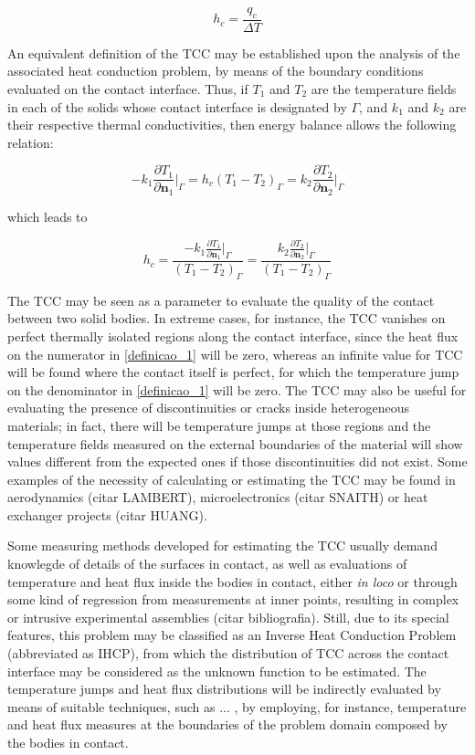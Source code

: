 \documentclass[conference,compsoc]{IEEEtran}
\begin{document}
\begin{equation}
h_c = \frac{q_c}{\Delta T} \label{definicao_1}
\end{equation}

An equivalent definition of the TCC may be established upon the analysis of the associated heat conduction problem, by means of the boundary conditions evaluated on the contact interface. Thus, if $T_1$ and $T_2$ are the temperature fields in each of the solids whose contact interface is designated by $\Gamma$, and  $k_1$ and $k_2$ are their respective thermal conductivities, then energy balance allows the following relation:

\begin{equation}
-k_1\frac{\partial T_1}{\partial \mathbf{n}_1}\bigg|_\Gamma
=
h_c(T_1 - T_2)_\Gamma
=
k_2\frac{\partial T_2}{\partial \mathbf{n}_2}\bigg|_\Gamma \label{definicao_2}
\end{equation}

which leads to

\begin{equation}
h_c = \frac{-k_1\displaystyle\frac{\partial T_1}{\partial \mathbf{n}_1}\bigg|_\Gamma}{(T_1 - T_2)_\Gamma} = \frac{k_2\displaystyle\frac{\partial T_2}{\partial \mathbf{n}_2}\bigg|_\Gamma}{(T_1 - T_2)_\Gamma} \label{eq:definicao_3}
\end{equation}

The TCC may be seen as a parameter to evaluate the quality of the contact between two solid bodies. In extreme cases, for instance, the TCC vanishes on perfect thermally isolated regions along the contact interface, since the heat flux on the numerator in \eqref{definicao_1} will be zero, whereas an infinite value for TCC will be found where the contact itself is perfect, for which the temperature jump on the denominator in \eqref{definicao_1} will be zero. The TCC may also be useful for evaluating the presence of discontinuities or cracks inside heterogeneous materials; in fact, there will be temperature jumps at those regions and the temperature fields measured on the external boundaries of the material will show values different from the expected ones if those discontinuities did not exist. Some examples of the necessity of calculating or estimating the TCC may be found in aerodynamics (citar LAMBERT), microelectronics (citar SNAITH) or heat exchanger projects (citar HUANG). 

Some measuring methods developed for estimating the TCC usually demand knowlegde of details of the surfaces in contact, as well as evaluations of temperature and heat flux inside the bodies in contact, either \textit{in loco} or through some kind of regression from measurements at inner points, resulting in complex or intrusive experimental assemblies (citar bibliografia). Still, due to its special features, this problem may be classified as an Inverse Heat Conduction Problem (abbreviated as IHCP), from which the distribution of TCC across the contact interface may be considered as the unknown function to be estimated. The temperature jumps and heat flux distributions will be indirectly evaluated by means of suitable techniques, such as ... , by employing, for instance, temperature and heat flux measures at the boundaries of the problem domain composed by the bodies in contact. 
\end{document}
